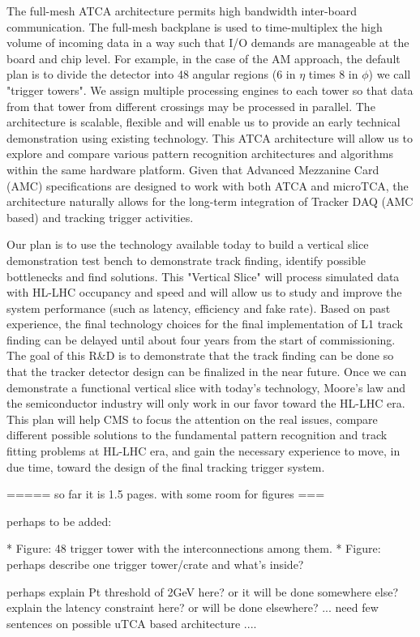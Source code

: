 	The full-mesh ATCA architecture permits high bandwidth inter-board communication. The full-mesh backplane is used to time-multiplex the high volume of incoming data in a way such that I/O demands are manageable at the board and chip level. For example, in the case of the AM approach, the default plan is to divide the detector into 48 angular regions (6 in $\eta$ times 8 in $\phi$) we call "trigger towers". We assign multiple processing engines to each tower so that data from that tower from different crossings may be processed in parallel. The architecture is scalable, flexible and will enable us to provide an early technical demonstration using existing technology. This ATCA architecture will allow us to explore and compare various pattern recognition architectures and algorithms within the same hardware platform. Given that Advanced Mezzanine Card (AMC) specifications are designed to work with both ATCA and microTCA, the architecture naturally allows for the long-term integration of Tracker DAQ (AMC based) and tracking trigger activities. 

	Our plan is to use the technology available today to build a vertical slice demonstration test bench to demonstrate track finding, identify possible bottlenecks and find solutions. This "Vertical Slice" will process simulated data with HL-LHC occupancy and speed and will allow us to study and improve the system performance (such as latency, efficiency and fake rate). Based on past experience, the final technology choices for the final implementation of L1 track finding can be delayed until about four years from the start of commissioning. The goal of this R\&D is to demonstrate that the track finding can be done so that the tracker detector design can be finalized in the near future. Once we can demonstrate a functional vertical slice with today's technology, Moore's law and the semiconductor industry will only work in our favor toward the HL-LHC era. This plan will help CMS to focus the attention on the real issues, compare different possible solutions to the fundamental pattern recognition and track fitting problems at HL-LHC era, and gain the necessary experience to move, in due time, toward the design of the final tracking trigger system.


=====  so far it is 1.5 pages. with some room for figures ===

perhaps to be added:

* Figure:   48 trigger tower with the interconnections among them. 
* Figure:   perhaps describe one trigger tower/crate and what's inside? 

perhaps explain Pt threshold of 2GeV here? or it will be done somewhere else?
explain the latency constraint here?  or will be done elsewhere? ... 
need few sentences on possible uTCA based architecture ....

